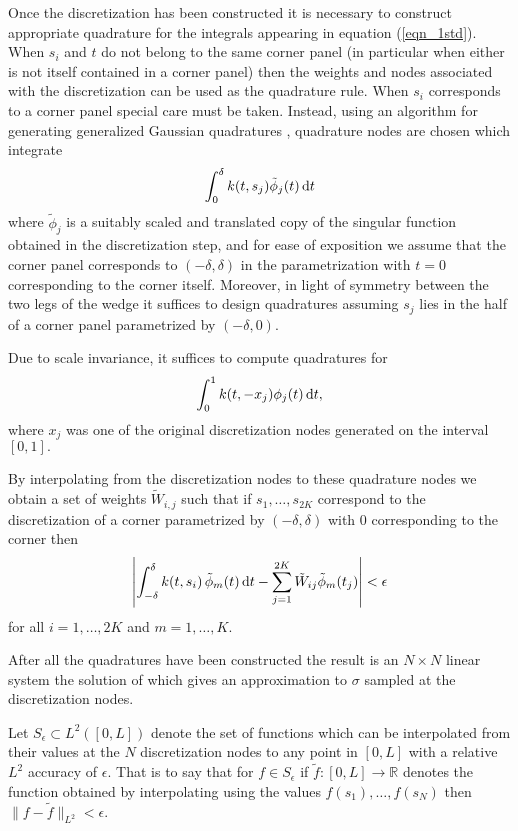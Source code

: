 Once the discretization has been constructed it is necessary to construct appropriate quadrature for the integrals appearing in equation (\ref{eqn_1std}). When $s_i$ and $t$ do not belong to the same corner panel (in particular when either is not itself contained in a corner panel) then the weights and nodes associated with the discretization can be used as the quadrature rule. When $s_i$ corresponds to a corner panel special care must be taken. Instead, using an algorithm for generating generalized Gaussian quadratures \cite{bremer2010}, quadrature nodes are chosen which integrate
\begin{align}
\int_{0}^\delta k(t,s_j) \tilde{\phi}_j(t)\,{\rm d}t
\end{align} 
where $\tilde{\phi}_j$ is a suitably scaled and translated copy of the singular function obtained in the discretization step, and for ease of exposition we assume that the corner panel corresponds to $(-\delta,\delta)$ in the parametrization with $t=0$ corresponding to the corner itself. Moreover, in light of symmetry between the two legs of the wedge it suffices to design quadratures assuming  $s_j$ lies in the half of a corner panel parametrized by $(-\delta,0).$
\begin{remark1}
Due to scale invariance, it suffices to compute quadratures for 
\begin{align}
\int_{0}^1 k(t,-x_j) {\phi}_j(t)\,{\rm d}t,
\end{align} 
where $x_j$ was one of the original discretization nodes generated on the interval $[0,1].$
\end{remark1}
\begin{remark1}
By interpolating from the discretization nodes to these quadrature nodes we obtain a set of weights $\tilde{W}_{i,j}$ such that if $s_1,\dots,s_{2K}$ correspond to the discretization of a corner parametrized by $(-\delta,\delta)$ with $0$ corresponding to the corner then
\begin{align}
\left| \int_{-\delta}^\delta k(t,s_i) \, \tilde{\phi}_m(t)\,{\rm d}t - \sum_{j=1}^{2K} \tilde{W}_{ij} \tilde{\phi}_{m}(t_j) \right| < \epsilon
\end{align}
for all $i=1,\dots,2K$ and $m=1,\dots,K.$
\end{remark1}

After all the quadratures have been constructed the result is an $N \times N$ linear system the solution of which gives an approximation to $\sigma$ sampled at the discretization nodes. 

\begin{definition}\label{def:seps}
Let $S_\epsilon \subset L^2([0,L])$ denote the set of functions which can be interpolated from their values at the $N$ discretization nodes to any point in $[0,L]$ with a relative $L^2$ accuracy of $\epsilon.$ That is to say that for $f \in S_\epsilon$ if $\tilde{f}:[0,L] \to \mathbb{R}$ denotes the function obtained by interpolating using the values $f(s_1),\dots,f(s_N)$ then $\|f -\tilde{f}\|_{L^2} < \epsilon.$ 
\end{definition}

